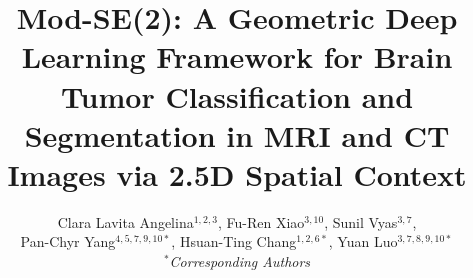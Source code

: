 \documentclass[10pt,twocolumn,letterpaper]{article}
\begin{document}
\title{Mod-SE(2): A Geometric Deep Learning Framework for Brain Tumor Classification and Segmentation in MRI and CT Images via 2.5D Spatial Context}

\author{
Clara Lavita Angelina$^{1,2,3}$, Fu-Ren Xiao$^{3,10}$, Sunil Vyas$^{3,7}$,\\
Pan-Chyr Yang$^{4,5,7,9,10*}$, Hsuan-Ting Chang$^{1,2,6*}$, Yuan Luo$^{3,7,8,9,10*}$\\
\textit{$^*$Corresponding Authors}\\
}

\maketitle






\end{document}
